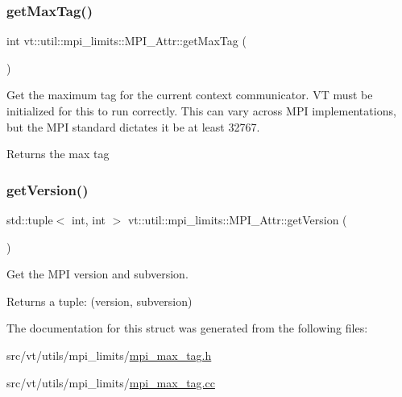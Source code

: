 \subsubsection{\texorpdfstring{get\+Max\+Tag()}{getMaxTag()}}
{\footnotesize\ttfamily int vt\+::util\+::mpi\+\_\+limits\+::\+M\+P\+I\+\_\+\+Attr\+::get\+Max\+Tag (\begin{DoxyParamCaption}{ }\end{DoxyParamCaption})\hspace{0.3cm}{\ttfamily [static]}}



Get the maximum tag for the current context communicator. VT must be initialized for this to run correctly. This can vary across M\+PI implementations, but the M\+PI standard dictates it be at least 32767. 

\begin{DoxyReturn}{Returns}
the max tag 
\end{DoxyReturn}
\mbox{\label{structvt_1_1util_1_1mpi__limits_1_1_m_p_i___attr_ae56b450a99da5c631b22e8f84d5f3c25}} 
\subsubsection{\texorpdfstring{get\+Version()}{getVersion()}}
{\footnotesize\ttfamily std\+::tuple$<$ int, int $>$ vt\+::util\+::mpi\+\_\+limits\+::\+M\+P\+I\+\_\+\+Attr\+::get\+Version (\begin{DoxyParamCaption}{ }\end{DoxyParamCaption})\hspace{0.3cm}{\ttfamily [static]}}



Get the M\+PI version and subversion. 

\begin{DoxyReturn}{Returns}
a tuple\+: (version, subversion) 
\end{DoxyReturn}


The documentation for this struct was generated from the following files\+:\begin{DoxyCompactItemize}
\item 
src/vt/utils/mpi\+\_\+limits/\hyperlink{mpi__max__tag_8h}{mpi\+\_\+max\+\_\+tag.\+h}\item 
src/vt/utils/mpi\+\_\+limits/\hyperlink{mpi__max__tag_8cc}{mpi\+\_\+max\+\_\+tag.\+cc}\end{DoxyCompactItemize}
